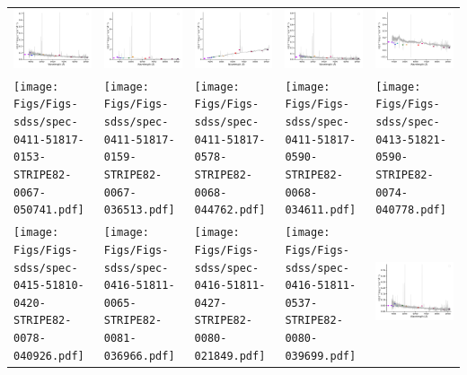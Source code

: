 \begin{center}
\begin{longtable}{l l l l l }
    \includegraphics[width=0.19\linewidth, clip]{Figs/Figs-sdss/spec-0409-51871-0596-STRIPE82-0062-010774.pdf} & \includegraphics[width=0.19\linewidth, clip]{Figs/Figs-sdss/spec-0410-51877-0217-STRIPE82-0063-024542.pdf} & \includegraphics[width=0.19\linewidth, clip]{Figs/Figs-sdss/spec-0410-51877-0492-STRIPE82-0064-042346.pdf} & \includegraphics[width=0.19\linewidth, clip]{Figs/Figs-sdss/spec-0410-51877-0519-STRIPE82-0064-031755.pdf} & \includegraphics[width=0.19\linewidth, clip]{Figs/Figs-sdss/spec-0410-51877-0527-STRIPE82-0064-069216.pdf} \\
    \texttt{[image: Figs/Figs-sdss/spec-0411-51817-0153-STRIPE82-0067-050741.pdf]} & \texttt{[image: Figs/Figs-sdss/spec-0411-51817-0159-STRIPE82-0067-036513.pdf]} & \texttt{[image: Figs/Figs-sdss/spec-0411-51817-0578-STRIPE82-0068-044762.pdf]} & \texttt{[image: Figs/Figs-sdss/spec-0411-51817-0590-STRIPE82-0068-034611.pdf]} & \texttt{[image: Figs/Figs-sdss/spec-0413-51821-0590-STRIPE82-0074-040778.pdf]} \\
    \texttt{[image: Figs/Figs-sdss/spec-0415-51810-0420-STRIPE82-0078-040926.pdf]} & \texttt{[image: Figs/Figs-sdss/spec-0416-51811-0065-STRIPE82-0081-036966.pdf]} & \texttt{[image: Figs/Figs-sdss/spec-0416-51811-0427-STRIPE82-0080-021849.pdf]} & \texttt{[image: Figs/Figs-sdss/spec-0416-51811-0537-STRIPE82-0080-039699.pdf]} & \includegraphics[width=0.19\linewidth, clip]{Figs/Figs-sdss/spec-0501-52235-0474-SPLUS-n03n01-003922.pdf} \\

\end{longtable}
\end{center}
